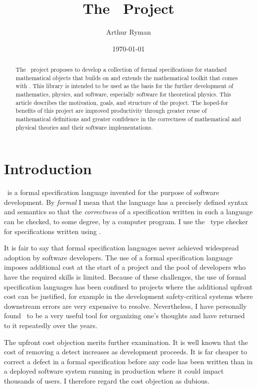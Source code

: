 \documentclass{amsart}
\begin{document}
\title{The \mathz\ Project}
\author{Arthur Ryman}
\date{\today}

\begin{abstract}
The \mathz\ project proposes to develop a collection of formal specifications for standard mathematical objects
that builds on and extends the mathematical toolkit that comes with \ZN.
This library is intended to be used as the basis for the further development of mathematics, physics, and software,
especially software for theoretical physics.
This article describes the motivation, goals, and structure of the project.
The hoped-for benefits of this project are improved productivity through greater reuse of mathematical definitions 
and greater confidence in the correctness of mathematical and physical theories and their software implementations.
\end{abstract}

\maketitle

\tableofcontents

\section{Introduction}

\ZN\ is a formal specification language invented for the purpose of software development.
By \emph{formal} I mean that the language has a precisely defined syntax and semantics so that 
the  \emph{correctness} of a specification written in such a language can be checked, to some degree,
by a computer program.
I use the \fuzz\ type checker for specifications written using \ZN.

It is fair to say that formal specification languages never achieved widespread adoption by software developers.
The use of a formal specification language imposes additional cost at the start of a project and the pool of developers
who have the required skills is limited.
Because of these challenges, the use of formal specification languages has been confined to projects where the
additional upfront cost can be justified, for example in the development safety-critical systems where downstream errors
are very expensive to resolve.
Nevertheless, I have personally found \ZN\ to be a very useful tool for organizing one's thoughts
and have returned to it repeatedly over the years.

The upfront cost objection merits further examination.
It is well known that the cost of removing a detect increases as development proceeds.
It is far cheaper to correct a defect in a formal specification before any code has been written
than in a deployed software system running in production
where it could impact thousands of users.
I therefore regard the cost objection as dubious.
\end{document}
